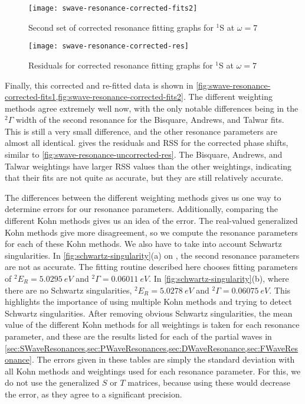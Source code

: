 \documentclass[Dissertation.tex]{subfiles}
\begin{document}
\begin{figure}[H]
	\centering
	\texttt{[image: swave-resonance-corrected-fits2]}
	\caption{Second set of corrected resonance fitting graphs for $^1$S at $\omega = 7$}
	\label{fig:swave-resonance-corrected-fits2}
\end{figure}

\begin{figure}[H]
	\centering
	\texttt{[image: swave-resonance-corrected-res]}
	\caption{Residuals for corrected resonance fitting graphs for $^1$S at $\omega = 7$}
	\label{fig:swave-resonance-corrected-res}
\end{figure}

Finally, this corrected and re-fitted data is shown in
\cref{fig:swave-resonance-corrected-fits1,fig:swave-resonance-corrected-fits2}. The different 
weighting methods agree extremely well now, with the only notable differences 
being in the $^2\Gamma$ width of the second resonance for the Bisquare, 
Andrews, and Talwar fits. This is still a very small difference, and the 
other resonance parameters are almost all identical.
 gives the residuals and RSS for the corrected phase
shifts, similar to \cref{fig:swave-resonance-uncorrected-res}. The Bisquare, Andrews, 
and Talwar weightings have larger RSS values than the other weightings, 
indicating that their fits are not quite as accurate, but they are still 
relatively accurate.

The differences between the different weighting methods gives us one way to 
determine errors for our resonance parameters. Additionally, comparing the 
different Kohn methods gives us an idea of the error. The real-valued 
generalized Kohn methods give more disagreement, so we compute the resonance 
parameters for each of these Kohn methods. We also have to take into account 
Schwartz singularities. In \cref{fig:schwartz-singularity}(a) on
\pageref{fig:schwartz-singularity}, the second resonance parameters are not as 
accurate. The fitting routine described here chooses fitting parameters of
$^2E_R = \SI{5.0295}{eV}$ and $^2\Gamma = \SI{0.06011}{eV}$.
In \cref{fig:schwartz-singularity}(b), where there are no Schwartz 
singularities, $^2E_R = \SI{5.0278}{eV}$ and $^2\Gamma = \SI{0.06075}{eV}$. 
This highlights the importance of using multiple Kohn methods and trying to 
detect Schwartz singularities. After removing obvious Schwartz singularities, 
the mean value of the different Kohn methods for all weightings is taken for 
each resonance parameter, and these are the results listed for each of the 
partial waves in
\cref{sec:SWaveResonances,sec:PWaveResonances,sec:DWaveResonance,sec:FWaveResonance}.
The errors given in these tables are simply the standard deviation with all 
Kohn methods and weightings used for each resonance parameter. For this, we 
do not use the generalized $S$ or $T$ matrices, because using these would 
decrease the error, as they agree to a significant precision.




\biblio
\end{document}
